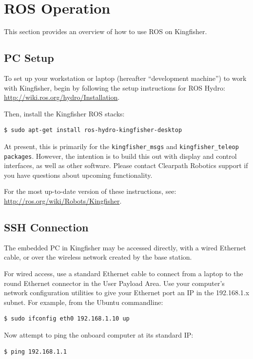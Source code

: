 \documentclass[]{clearpath-latex/clearpath-manual}
\begin{document}
\section{ROS Operation}
This section provides an overview of how to use ROS on Kingfisher.

\subsection{PC Setup}

To set up your workstation or laptop (hereafter “development machine”) to work with Kingfisher, begin by following the setup instructions for ROS Hydro: \url{http://wiki.ros.org/hydro/Installation}.

Then, install the Kingfisher ROS stacks:

\begin{lstlisting} 
$ sudo apt-get install ros-hydro-kingfisher-desktop
\end{lstlisting}

At present, this is primarily for the \lstinline{kingfisher_msgs} and \lstinline{kingfisher_teleop packages}. However, the intention is to build this out with display and control interfaces, as well as other software. Please contact Clearpath Robotics support if you have questions about upcoming functionality.

For the most up-to-date version of these instructions, see: \url{http://ros.org/wiki/Robots/Kingfisher}.

\subsection{SSH Connection}
The embedded PC in Kingfisher may be accessed directly, with a wired Ethernet cable, or over the wireless network created by the base station.

For wired access, use a standard Ethernet cable to connect from a laptop to the round Ethernet connector in the User Payload Area. Use your computer’s network configuration utilities to give your Ethernet port an IP in the 192.168.1.x subnet. For example, from the Ubuntu commandline:

\begin{lstlisting}
$ sudo ifconfig eth0 192.168.1.10 up
\end{lstlisting}

Now attempt to ping the onboard computer at its standard IP:

\begin{lstlisting}
$ ping 192.168.1.1
\end{lstlisting}
\end{document}
